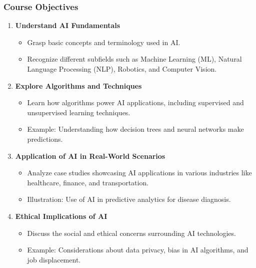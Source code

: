 \documentclass[aspectratio=169]{beamer}
\begin{document}
\begin{frame}[fragile]
    \frametitle{Course Objectives}
    \begin{enumerate}
        \item \textbf{Understand AI Fundamentals}
        \begin{itemize}
            \item Grasp basic concepts and terminology used in AI.
            \item Recognize different subfields such as Machine Learning (ML), Natural Language Processing (NLP), Robotics, and Computer Vision.
        \end{itemize}
        
        \item \textbf{Explore Algorithms and Techniques}
        \begin{itemize}
            \item Learn how algorithms power AI applications, including supervised and unsupervised learning techniques.
            \item Example: Understanding how decision trees and neural networks make predictions.
        \end{itemize}
        
        \item \textbf{Application of AI in Real-World Scenarios}
        \begin{itemize}
            \item Analyze case studies showcasing AI applications in various industries like healthcare, finance, and transportation.
            \item Illustration: Use of AI in predictive analytics for disease diagnosis.
        \end{itemize}

        \item \textbf{Ethical Implications of AI}
        \begin{itemize}
            \item Discuss the social and ethical concerns surrounding AI technologies.
            \item Example: Considerations about data privacy, bias in AI algorithms, and job displacement.
        \end{itemize}
    \end{enumerate}
\end{frame}
\end{document}
